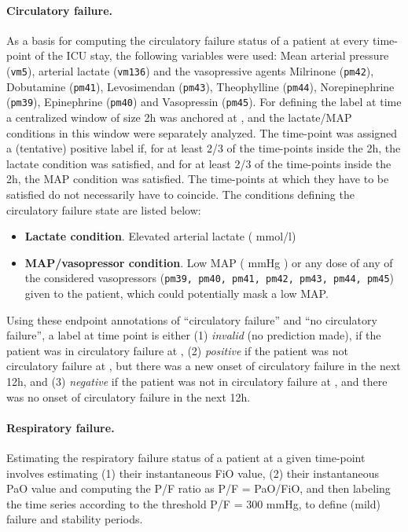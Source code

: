\documentclass{article}
\begin{document}
\paragraph{Circulatory failure.}As a basis for computing the circulatory failure status of a patient at every time-point of the ICU stay, the following variables were used: Mean arterial pressure (\texttt{vm5}), arterial lactate (\texttt{vm136}) and the vasopressive agents Milrinone (\texttt{pm42}), Dobutamine (\texttt{pm41}), Levosimendan (\texttt{pm43}), Theophylline (\texttt{pm44}), Norepinephrine (\texttt{pm39}), Epinephrine (\texttt{pm40}) and Vasopressin (\texttt{pm45}). For defining the label at time  a centralized window of size 2h was anchored at , and the lactate/MAP conditions in this window were separately analyzed. The time-point was assigned a (tentative) positive label if, for at least 2/3 of the time-points inside the 2h, the lactate condition was satisfied, and for at least 2/3 of the time-points inside the 2h, the MAP condition was satisfied. 
The time-points at which they have to be satisfied do not necessarily have to coincide. The conditions defining the circulatory failure state are listed below:

\begin{itemize}
\item \textbf{Lactate condition}. Elevated arterial lactate ( mmol/l)
\item \textbf{MAP/vasopressor condition}. Low MAP ( mmHg ) or any dose 
of any of the considered vasopressors (\texttt{pm39, pm40, pm41, pm42, pm43, pm44, pm45})
given to the patient, which could potentially mask a low MAP.
\end{itemize}


Using these endpoint annotations of ``circulatory failure'' and ``no circulatory failure'', a label at time point  is either (1) \textit{invalid} (no prediction made), if the patient was in circulatory failure at , (2) \textit{positive} if the patient was not circulatory failure at , but there was a new onset of circulatory failure in the next 12h, and (3) \textit{negative} if the patient was not in circulatory failure at , and there was no onset of circulatory failure in the next 12h.

\paragraph{Respiratory failure.}Estimating the respiratory failure status of a patient at a given time-point involves estimating (1) their instantaneous FiO value, (2) their instantaneous PaO value and computing the P/F ratio as P/F = PaO/FiO, and then labeling the time series according to the threshold P/F = 300 mmHg, to define (mild) failure and stability periods.
\end{document}
